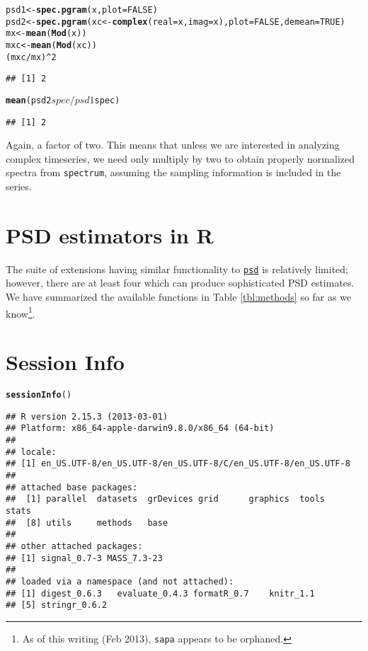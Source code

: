 \documentclass[11pt]{article}\usepackage{graphicx, color}
\makeatletter
\newcommand{\hlfunctioncall}[1]{\textcolor[rgb]{0.501960784313725,0,0.329411764705882}{\textbf{#1}}}%
\newenvironment{kframe}{%
 \def\at@end@of@kframe{}%
 \ifinner\ifhmode%
  \def\at@end@of@kframe{\end{minipage}}%
  \begin{minipage}{\columnwidth}%
 \fi\fi%
 \def\FrameCommand##1{\hskip\@totalleftmargin \hskip-\fboxsep
 \colorbox{shadecolor}{##1}\hskip-\fboxsep
     \hskip-\linewidth \hskip-\@totalleftmargin \hskip\columnwidth}%
 \MakeFramed {\advance\hsize-\width
   \@totalleftmargin\z@ \linewidth\hsize
   \@setminipage}}%
 {\par\unskip\endMakeFramed%
 \at@end@of@kframe}
\newenvironment{knitrout}{}{} %
\newcommand{\Rcmd}[1]{\texttt{#1}}
\newcommand{\psd}[0]{\href{http://abarbour.github.com/psd/}{\color{blue}\Rcmd{psd}}}
\makeatother
\begin{document}
\begin{knitrout}
\color{fgcolor}\begin{kframe}
\begin{alltt}
psd1 <- \hlfunctioncall{spec.pgram}(x, plot = FALSE)
psd2 <- \hlfunctioncall{spec.pgram}(xc <- \hlfunctioncall{complex}(real = x, imag = x), plot = FALSE, demean = TRUE)
mx <- \hlfunctioncall{mean}(\hlfunctioncall{Mod}(x))
mxc <- \hlfunctioncall{mean}(\hlfunctioncall{Mod}(xc))
(mxc/mx)^2
\end{alltt}
\begin{verbatim}
## [1] 2
\end{verbatim}
\begin{alltt}
\hlfunctioncall{mean}(psd2$spec/psd1$spec)
\end{alltt}
\begin{verbatim}
## [1] 2
\end{verbatim}
\end{kframe}
\end{knitrout}


Again, a factor of two. 
This means that unless we are interested in analyzing complex
timeseries, we need only multiply by two 
to obtain properly normalized spectra
from \Rcmd{spectrum}, 
assuming the sampling information is included in the series.

\section{PSD estimators in R}
The suite of extensions having
similar functionality to \psd{}
is relatively limited; however, there are at least four which
can produce sophisticated PSD estimates.   We have
summarized the available functions in Table \ref{tbl:methods}
so far as we know\footnote{
As of this writing (Feb 2013), \Rcmd{sapa} appears to be orphaned.
}.



\pagebreak
\section*{Session Info}
\begin{knitrout}
\color{fgcolor}\begin{kframe}
\begin{alltt}
\hlfunctioncall{sessionInfo}()
\end{alltt}
\begin{verbatim}
## R version 2.15.3 (2013-03-01)
## Platform: x86_64-apple-darwin9.8.0/x86_64 (64-bit)
## 
## locale:
## [1] en_US.UTF-8/en_US.UTF-8/en_US.UTF-8/C/en_US.UTF-8/en_US.UTF-8
## 
## attached base packages:
##  [1] parallel  datasets  grDevices grid      graphics  tools     stats    
##  [8] utils     methods   base     
## 
## other attached packages:
## [1] signal_0.7-3 MASS_7.3-23 
## 
## loaded via a namespace (and not attached):
## [1] digest_0.6.3   evaluate_0.4.3 formatR_0.7    knitr_1.1     
## [5] stringr_0.6.2
\end{verbatim}
\end{kframe}
\end{knitrout}






\printindex
\end{document}
